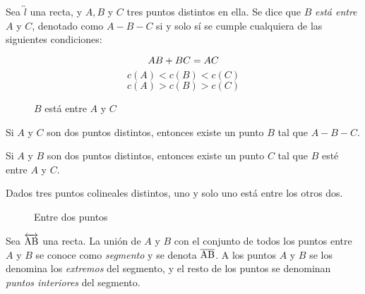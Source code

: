 \begin{definition}
    Sea $\overleftrightarrow{l}$ una recta, y $A, B$ y $C$ tres puntos distintos en ella. Se dice que $B$ \textit{está entre} $A$ y $C$, denotado como $A-B-C$ si y solo sí se cumple cualquiera de las siguientes condiciones:

    \begin{equation}
            AB + BC = AC \\
    \end{equation}
    \begin{equation}
        c(A) < c(B) < c(C)
    \end{equation}
    \begin{equation}
        c(A) > c(B) > c(C)
    \end{equation}

    \begin{figure}[!h]
        \centering
        
        \caption{$B$ está entre $A$ y $C$}
        \label{fig:plot11}
    \end{figure}
    
\end{definition}

\clearpage

\begin{theorem}
    Si $A$ y $C$ son dos puntos distintos, entonces existe un punto $B$ tal que $A-B-C$.
\end{theorem}

\begin{theorem}
    Si $A$ y $B$ son dos puntos distintos, entonces existe un punto $C$ tal que $B$ esté entre $A$ y $C$.
\end{theorem}

\begin{postulate}
    Dados tres puntos colineales distintos, uno y solo uno está entre los otros dos.
    
    \begin{figure}[!h]
        \centering
        
        \caption{Entre dos puntos}
        \label{fig:plot12}
    \end{figure}
    
\end{postulate}

\begin{definition}
    Sea $\overleftrightarrow{\rm AB}$ una recta. La unión de $A$ y $B$ con el conjunto de todos los puntos entre $A$ y $B$ se conoce como \textit{segmento} y se denota $\overline{\rm AB}$. A los puntos $A$ y $B$ se los denomina los \textit{extremos} del segmento, y el resto de los puntos se denominan \textit{puntos interiores} del segmento. 
\end{definition}


